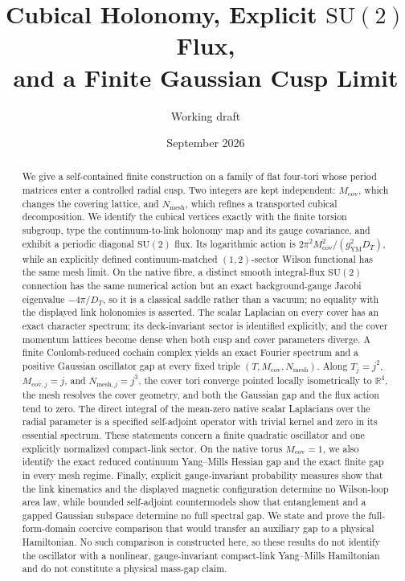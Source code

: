 \documentclass[11pt]{article}
\title{\bfseries Cubical Holonomy, Explicit \(\mathrm{SU}(2)\) Flux,\\
and a Finite Gaussian Cusp Limit}
\author{Working draft}
\date{September 2026}
\theoremstyle{definition}
\numberwithin{equation}{section}
\begin{document}
\maketitle

\begin{abstract}
We give a self-contained finite construction on a family of flat four-tori
whose period matrices enter a controlled radial cusp.  Two integers are kept
independent: \(M_{\mathrm{cov}}\), which changes the covering lattice, and
\(N_{\mathrm{mesh}}\), which refines a transported cubical decomposition.
We identify the cubical vertices exactly with the finite torsion subgroup,
type the continuum-to-link holonomy map and its gauge covariance, and exhibit
a periodic diagonal \(\mathrm{SU}(2)\) flux.  Its logarithmic action is
\(2\pi^2M_{\mathrm{cov}}^2/(g_{\mathrm{YM}}^2D_T)\), while an explicitly
defined continuum-matched \((1,2)\)-sector Wilson functional has the same
mesh limit.  On the native fibre, a distinct smooth integral-flux
\(\mathrm{SU}(2)\) connection has the same numerical action but an exact
background-gauge Jacobi eigenvalue \(-4\pi/D_T\), so it is a classical saddle
rather than a vacuum; no equality with the displayed link holonomies is
asserted.  The scalar Laplacian on every cover has an exact character
spectrum; its deck-invariant sector is identified explicitly, and the cover
momentum lattices become dense when both cusp and cover parameters diverge.
A finite Coulomb-reduced cochain complex yields an exact Fourier spectrum and
a positive Gaussian oscillator gap at every fixed triple
\((T,M_{\mathrm{cov}},N_{\mathrm{mesh}})\).  Along
\(T_j=j^2\), \(M_{\mathrm{cov},j}=j\), and
\(N_{\mathrm{mesh},j}=j^3\), the cover tori converge pointed locally
isometrically to \(\mathbb R^4\), the mesh resolves the cover geometry, and
both the Gaussian gap and the flux action tend to zero.  The direct integral
of the mean-zero native scalar Laplacians over the radial parameter is a
specified self-adjoint operator with trivial kernel and zero in its essential
spectrum.  These statements
concern a finite quadratic oscillator and one explicitly normalized
compact-link sector.  On the native torus \(M_{\mathrm{cov}}=1\), we also
identify the exact reduced continuum Yang--Mills Hessian gap and the exact
finite gap in every mesh regime.  Finally, explicit gauge-invariant
probability measures show that the link kinematics and the displayed magnetic
configuration determine no Wilson-loop area law, while bounded self-adjoint
countermodels show that entanglement and a gapped Gaussian subspace determine
no full spectral gap.  We state and prove the full-form-domain coercive
comparison that would transfer an auxiliary gap to a physical Hamiltonian.
No such comparison is constructed here, so these results do not identify the
oscillator with a nonlinear, gauge-invariant compact-link Yang--Mills
Hamiltonian and do not constitute a physical mass-gap claim.
\end{abstract}
\end{document}

